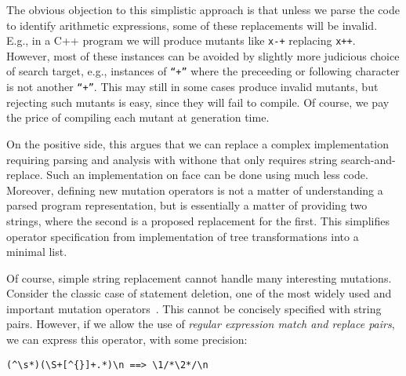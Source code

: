 \documentclass[sigconf,review, anonymous]{acmart}
\begin{document}
The obvious objection to this simplistic approach is that unless we
parse the code to identify arithmetic expressions, some of these
replacements will be invalid.  E.g., in a C++ program we will produce
mutants like {\tt x-+} replacing {\tt x++}.  However, most of these
instances can be avoided by slightly more judicious choice of search
target, e.g., instances of {\tt ``+''} where the preceeding or following
character is not another {\tt ``+''}.  This may still in some cases produce
invalid mutants, but rejecting such mutants is easy, since they will fail
to compile.  Of course, we pay the price of
compiling each mutant at generation
time.

On the positive side, this argues that we can replace a
complex implementation requiring parsing and analysis with
withone that only requires string search-and-replace.
Such an implementation on face can be done using much less code. 
Moreover, defining new mutation operators is not a matter of
understanding a parsed program representation, but is essentially
a matter of providing two strings, where the second is a proposed
replacement for the first.  This simplifies operator specification from
implementation of
tree transformations into a minimal list. 

Of course, simple string replacement cannot handle
many interesting mutations.  Consider the classic case of statement
deletion, one of the most widely used and important mutation
operators~\cite{deng2013empirical}. This cannot be concisely specified with string pairs. 
However, if we allow the use of
\emph{regular expression match and replace pairs}, we can express this operator, with some precision:

\begin{verbatim}
(^\s*)(\S+[^{}]+.*)\n ==> \1/*\2*/\n
\end{verbatim}
\end{document}
